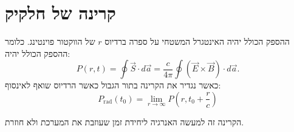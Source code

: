 \documentclass{tstextbook}
\begin{document}
\section{קרינה של חלקיק}

\begin{definition}[קרינה]
ההספק הכולל יהיה האינטגרל המשטחי על ספרה ברדיוס \(r\) של הווקטור פוינטינג. כלומר ההספק הכולל יהיה:
$$P\left(r,t\right)=\oint\vec{S}\cdot d\vec{a}={\frac{c}{4\pi}}\oint\left( \vec{E}\times\vec{B} \right)\cdot d\vec{a}.$$
כאשר נגדיר את הקרינה בתור הגבול כאשר הרדיוס שואף לאינסוף:
$$P_{\mathrm{rad}}(t_{0})=\operatorname*{lim}_{r\to\infty}P\left(r,t_{0}+{\frac{r}{c}}\right)$$

\end{definition}
הקרינה זה למעשה האנרגיה ליחידת זמן שעוזבת את המערכת ולא חוזרת.
\end{document}
